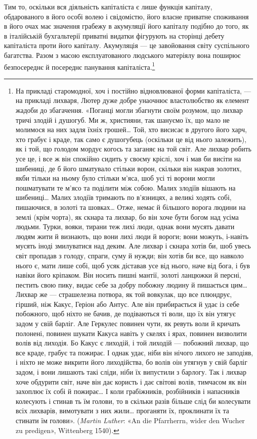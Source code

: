 Тим то, оскільки вся діяльність капіталіста є лише функція
капіталу, обдарованого в його особі волею і свідомістю, його
власне приватне споживання в його очах має значення грабежу
в акумуляції його капіталу подібно до того, як в італійській
бухгальтерії приватні видатки фігурують на сторінці дебету
капіталіста проти його капіталу. Акумуляція — це завойовання
світу суспільного багатства. Разом з масою експлуатованого людського
матеріялу вона поширює безпосереднє й посереднє панування
капіталіста.\footnote{
На прикладі старомодної, хоч і постійно відновлюваної форми
капіталіста, — на прикладі лихваря, Лютер дуже добре унаочнює властолюбство
як елемент жадоби до збагачення. «Поганці могли збагнути
своїм розумом, що лихвар тричі злодій і душогуб. Ми ж, християни, так
шануємо їх, що мало не молимося на них задля їхніх грошей\dots{} Той, хто
висисає в другого його харч, хто грабує і краде, так само є душогубець
(оскільки це від нього залежить), як і той, що голодом мордує когось
та заганяє на той світ. Але лихвар робить усе це, і все ж він спокійно
сидить у своєму кріслі, хоч і мав би висіти на шибениці, де б його шматувало
стільки ворон, скільки він накрав золотих, якби тільки на ньому
було стільки м’яса, шоб усі ті ворони могли пошматувати те м’ясо та
поділити між собою. Малих злодіїв вішають на шибениці\dots{} Малих злодіїв
тримають по в’язницях, а великі ходять собі, пишаючися, в золоті
та шовках\dots{} Отже, немає й більшого ворога людини на землі (крім чорта),
як скнара та лихвар, бо він хоче бути богом над усіма людьми. Турки,
вояки, тирани теж лихі люди, однак вони мусять давати людям жити й
визнають, що вони лихі люди й вороги; вони можуть, і-навіть мусять
іноді змилуватися над деким. Але лихвар і скнара хотів би, шоб увесь
світ пропадав з голоду, спраги, суму й нужди; він хотів би все, що навколо
нього є, мати лише собі, щоб усяк діставав усе від нього, наче від бога,
і був навіки його кріпаком. Він носить пишні мантії, золоті ланцюжки
й персні, пестить свою пику, видає себе за добру побожну людину
й пишається цим\dots{} Лихвар же — страшелезна потвора, як той вовкулак,
що все плюндрує, гірший, ніж Какус, Геріон або Антус. Але він
прибирається й удає із себе побожного, щоб ніхто не бачив, де подіваються
ті воли, що їх він утягує задом у свій барліг. Але Геркулес повинен
чути, як ревуть воли й кричать полонені, повинен шукати Какуса навіть
у скелях і ярах, повинен визволити волів від лиходія. Бо Какус є лиходій,
і той лиходій — побожний лихвар, що все краде, грабує та пожирає.
І однак удає, ніби він нічого лихого не заподіяв, і ніхто не може викрити
його лиходійства, бо волів оін утягнув у свій барліг задом, і вони лишають
такі сліди, ніби їх випустили з барлогу. Так і лихвар хоче обдурити
світ, наче він дає користь і дає світові волів, тимчасом як він
захоплює їх собі й пожирає\dots{} І коли грабіжників, розбійників і напасників
колесують і стинав ть їм голови, то в скільки разів більше слід
би колесувати всіх лихварів, вимотувати з них жили\dots{} проганяти їх,
проклинати їх та стинати їм голови». (\emph{Martin Luther}: «An die Pfarrherrn,
wider den Wucher zu predigen», Wittenberg 1540).
}

